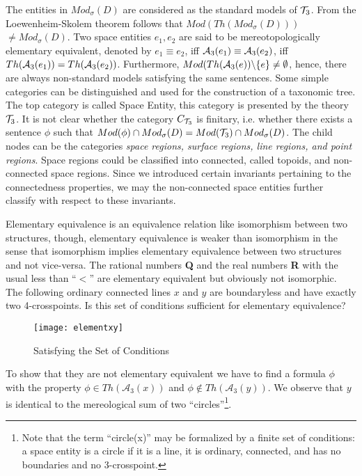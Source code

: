 \documentclass{ao2e}
\begin{document}
{The entities in $Mod_{\sigma} (D)$ are considered as the standard models of ${\cal T}_3$. From the Loewenheim-Skolem theorem follows that 
$Mod(Th(Mod_{\sigma} (D)))$ $\neq Mod_{\sigma} (D)$.
Two space entities $e_1, e_2$ are said to be mereotopologically elementary equivalent, denoted by
$e_1 \equiv e_2$, iff ${\cal A}_3 (e_1) \equiv {\cal A}_3 (e_2)$, iff $Th({\cal A}_3 (e_1)) = Th({\cal A}_3 (e_2))$.
Furthermore, $Mod(Th({\cal A}_3(e))\backslash \{e \} \neq \emptyset$, hence, there are always non-standard models
satisfying the same sentences. Some simple categories can be distinguished and used for the construction of a taxonomic tree. The top category is called Space Entity, this category is presented by the theory ${\cal T}_3$.
It is not clear whether the category $C_{{\cal T}_3}$ is finitary, i.e. whether there exists a sentence $\phi$
such that $Mod(\phi) \cap Mod_{\sigma}(D) = Mod({\cal T}_3) \cap Mod_{\sigma} (D)$.
The child nodes can be the categories {\it space regions, surface regions,
line regions, and point regions}. Space regions could be classified into connected, called topoids, and non-connected
space regions. Since we introduced certain invariants pertaining to the connectedness properties, we may the non-connected space entities further classify with respect to these invariants. 


Elementary equivalence is an equivalence relation like isomorphism between two structures, though, elementary equivalence is weaker than isomorphism in the sense that isomorphism implies elementary equivalence between two structures and not vice-versa. The rational numbers \textbf{Q} and the real numbers \textbf{R} with the usual less than ``$<$'' are elementary equivalent but obviously not isomorphic. 
The following ordinary connected lines $x$ and $y$ are boundaryless and have exactly two 4-crosspoints. Is this set of conditions sufficient for elementary equivalence?

\begin{figure}[H]
\centering
\texttt{[image: elementxy]}
\caption{Satisfying the Set of Conditions}
\label{SSP}
\end{figure}

To show that they are not elementary equivalent we have to find a formula $\phi$ with the property $\phi\in Th(\mathcal{A}_3(x))$ and $\phi\notin Th(\mathcal{A}_3(y))$. We observe that $y$ is identical to the mereological sum of two ``circles''\footnote{Note that the term ``circle(x)'' may be formalized by a finite set of conditions: a space entity is a circle if it is a line, it is ordinary, connected, and has no boundaries and no 3-crosspoint.}.


}
\end{document}
